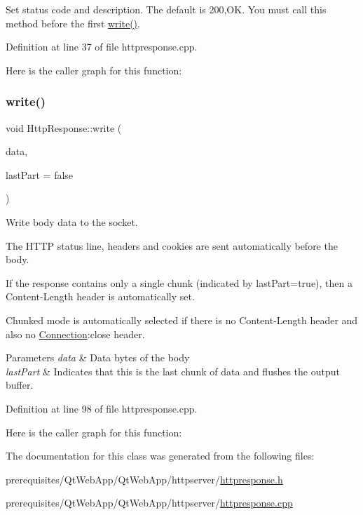 Set status code and description. The default is 200,OK. You must call this method before the first \mbox{\hyperlink{classstefanfrings_1_1_http_response_a6e49919cc568835ca6d81fec02533260}{write()}}. 

Definition at line 37 of file httpresponse.\+cpp.

Here is the caller graph for this function\+:
\mbox{\label{classstefanfrings_1_1_http_response_a6e49919cc568835ca6d81fec02533260}} 
\subsubsection{\texorpdfstring{write()}{write()}}
{\footnotesize\ttfamily void Http\+Response\+::write (\begin{DoxyParamCaption}\item[{Q\+Byte\+Array}]{data,  }\item[{bool}]{last\+Part = {\ttfamily false} }\end{DoxyParamCaption})}

Write body data to the socket. 

The H\+T\+TP status line, headers and cookies are sent automatically before the body. 

If the response contains only a single chunk (indicated by last\+Part=true), then a Content-\/\+Length header is automatically set. 

Chunked mode is automatically selected if there is no Content-\/\+Length header and also no \mbox{\hyperlink{struct_connection}{Connection}}\+:close header. 
\begin{DoxyParams}{Parameters}
{\em data} & Data bytes of the body \\
\hline
{\em last\+Part} & Indicates that this is the last chunk of data and flushes the output buffer. \\
\hline
\end{DoxyParams}


Definition at line 98 of file httpresponse.\+cpp.

Here is the caller graph for this function\+:


The documentation for this class was generated from the following files\+:\begin{DoxyCompactItemize}
\item 
prerequisites/\+Qt\+Web\+App/\+Qt\+Web\+App/httpserver/\mbox{\hyperlink{httpresponse_8h}{httpresponse.\+h}}\item 
prerequisites/\+Qt\+Web\+App/\+Qt\+Web\+App/httpserver/\mbox{\hyperlink{httpresponse_8cpp}{httpresponse.\+cpp}}\end{DoxyCompactItemize}
